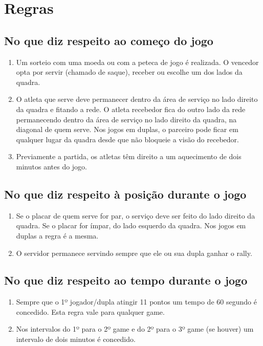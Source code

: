 \documentclass[
	article,			%
	11pt,				%
	oneside,			%
	a4paper,			%
	english,			%
	brazil,				%
	sumario=tradicional
	]{abntex2}
\begin{document}

\setlrmarginsandblock{3cm}{3cm}{*}
\setulmarginsandblock{3cm}{3cm}{*}
\checkandfixthelayout

\section{Regras}
\subsection{No que diz respeito ao começo do jogo}
\begin{enumerate}
	\item Um sorteio com uma moeda ou com a peteca de jogo é realizada. O vencedor opta por servir (chamado de saque), receber ou escolhe um dos lados da quadra.
	\item O atleta que serve deve permanecer dentro da área de serviço no lado direito da quadra e fitando a rede. O atleta recebedor fica do outro lado da rede permanecendo dentro da área de serviço no lado direito da quadra, na diagonal de quem serve. Nos jogos em duplas, o parceiro pode ficar em qualquer lugar da quadra desde que não bloqueie a visão do recebedor. 
	\item Previamente a partida, os atletas têm direito a um aquecimento de dois minutos antes do jogo.
\end{enumerate}

\subsection{No que diz respeito à posição durante o jogo}
\begin{enumerate}
	\item Se o placar de quem serve for par, o serviço deve ser feito do lado direito da quadra. Se o placar for ímpar, do lado esquerdo da quadra. Nos jogos em duplas a regra é a mesma. 
	\item O servidor permanece servindo sempre que ele ou sua dupla ganhar o rally. 
\end{enumerate}

\subsection{No que diz respeito ao tempo durante o jogo}
\begin{enumerate}
	\item Sempre que o 1º jogador/dupla atingir 11 pontos um tempo de 60 segundo é concedido. Esta regra vale para qualquer game.
	\item Nos intervalos do 1º para o 2º game e do 2º para o 3º game (se houver) um intervalo de dois minutos é concedido. 
\end{enumerate}
\end{document}
